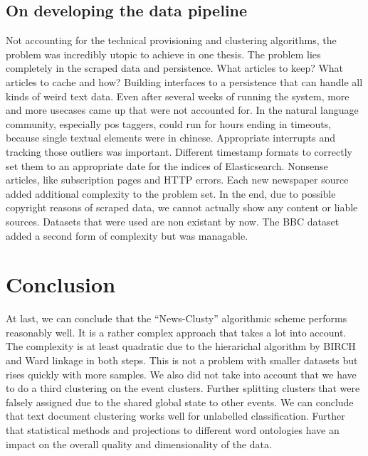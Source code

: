 \subsection*{On developing the data pipeline} 
Not accounting for the technical provisioning and clustering algorithms, the problem was incredibly utopic to achieve in one thesis. The problem lies completely in the scraped data and persistence. What articles to keep? What articles to cache and how? Building interfaces to a persistence that can handle all kinds of weird text data. Even after several weeks of running the system, more and more usecases came up that were not accounted for. In the natural language community, especially pos taggers, could run for hours ending in timeouts, because single textual elements were in chinese. Appropriate interrupts and tracking those outliers was important. Different timestamp formats to correctly set them to an appropriate date for the indices of Elasticsearch. Nonsense articles, like subscription pages and HTTP errors. Each new newspaper source added additional complexity to the problem set. In the end, due to possible copyright reasons of scraped data, we cannot actually show any content or liable sources. Datasets that were used are non existant by now. The BBC dataset added a second form of complexity but was managable.


\section{Conclusion}
At last, we can conclude that the ``News-Clusty'' algorithmic scheme performs reasonably well. It is a rather complex approach that takes a lot into account. The complexity is at least quadratic due to the hierarichal algorithm by BIRCH and Ward linkage in both steps. This is not a problem with smaller datasets but rises quickly with more samples. We also did not take into account that we have to do a third clustering on the event clusters. Further splitting clusters that were falsely assigned due to the shared global state to other events. We can conclude that text document clustering works well for unlabelled classification. Further that statistical methods and projections to different word ontologies have an impact on the overall quality and dimensionality of the data. 

